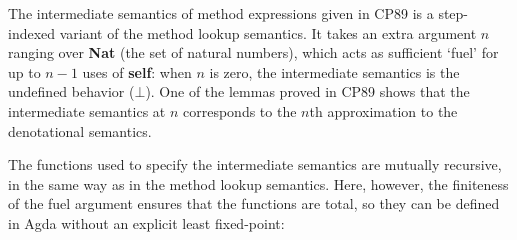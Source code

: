 \begin{AgdaAlign}
The intermediate semantics of method expressions given in CP89
is a step-indexed variant of the method lookup semantics.
It takes an extra argument $n$ ranging over \textbf{Nat} (the set of natural numbers),
which acts as sufficient `fuel' for up to $n-1$ uses of \textbf{self}:
when $n$ is zero, the intermediate semantics is the undefined behavior ($\bot$).
One of the lemmas proved in CP89 shows that the intermediate semantics at $n$
corresponds to the $n$th approximation to the denotational semantics.

The functions used to specify the intermediate semantics are mutually recursive,
in the same way as in the method lookup semantics.
Here, however, the finiteness of the fuel argument ensures that the functions are total,
so they can be defined in Agda without an explicit least fixed-point:
%
\begin{code}%
%
\>[2]%
\>[11]\AgdaSymbol{:}\AgdaSpace{}%
\AgdaSpace{}%
\AgdaSpace{}%
\AgdaSpace{}%
\AgdaSpace{}%
\AgdaSpace{}%
\AgdaSpace{}%
\<%
\\
%
\>[2]%
\>[11]\AgdaSymbol{:}\AgdaSpace{}%
\AgdaSpace{}%
\AgdaSpace{}%
\AgdaSpace{}%
\AgdaSpace{}%
\AgdaSpace{}%
\AgdaSpace{}%
\AgdaSpace{}%
\AgdaSpace{}%
\<%
\\
%
\>[2]%
\>[11]\AgdaSymbol{:}\AgdaSpace{}%
\AgdaSpace{}%
\AgdaSpace{}%
\AgdaSpace{}%
\AgdaSpace{}%
\AgdaSpace{}%
\AgdaSpace{}%
\AgdaSpace{}%
\AgdaSpace{}%
\AgdaSpace{}%
\AgdaSpace{}%
\<%
\\
%
\\[\AgdaEmptyExtraSkip]%
%
\>[2]\AgdaSpace{}%
\AgdaSpace{}%
\AgdaSpace{}%
\AgdaSymbol{=}\AgdaSpace{}%
\AgdaSpace{}%
\AgdaSpace{}%
\AgdaSymbol{(}\AgdaSpace{}%
\AgdaSymbol{)}\AgdaSpace{}%
\<%
\\
%
\\[\AgdaEmptyExtraSkip]%
%
\>[2]\AgdaSpace{}%

\end{code}
\end{AgdaAlign}
